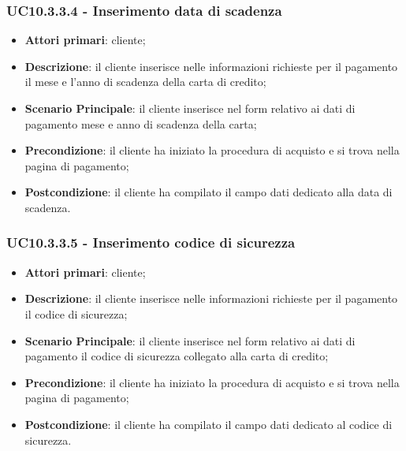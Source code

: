 \subsubsection{UC10.3.3.4 - Inserimento data di scadenza}
\begin{itemize}
\item \textbf{Attori primari}: cliente;
\item \textbf{Descrizione}: il cliente inserisce nelle informazioni richieste per il pagamento il mese e l'anno di scadenza della carta di credito;
\item \textbf{Scenario Principale}: il cliente inserisce nel form relativo ai dati di pagamento mese e anno di scadenza della carta;
\item \textbf{Precondizione}: il cliente ha iniziato la procedura di acquisto e si trova nella pagina di pagamento;
\item \textbf{Postcondizione}: il cliente ha compilato il campo dati dedicato alla data di scadenza.
\end{itemize}

\subsubsection{UC10.3.3.5 - Inserimento codice di sicurezza}
\begin{itemize}
\item \textbf{Attori primari}: cliente;
\item \textbf{Descrizione}: il cliente inserisce nelle informazioni richieste per il pagamento il codice di sicurezza;
\item \textbf{Scenario Principale}: il cliente inserisce nel form relativo ai dati di pagamento il codice di sicurezza collegato alla carta di credito;
\item \textbf{Precondizione}: il cliente ha iniziato la procedura di acquisto e si trova nella pagina di pagamento;
\item \textbf{Postcondizione}: il cliente ha compilato il campo dati dedicato al codice di sicurezza.
\end{itemize}

